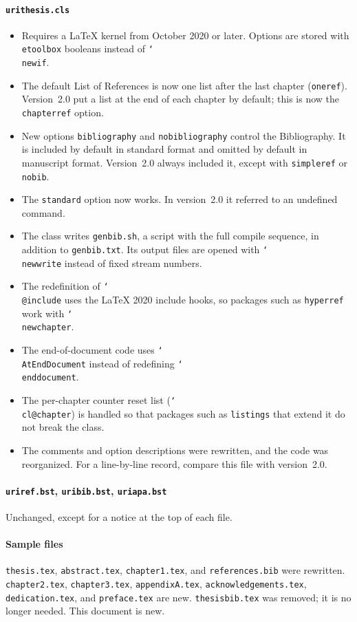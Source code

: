 \documentclass[11pt]{article}
\newcommand\cs[1]{\texttt{\char`\\#1}}
\newcommand\opt[1]{\texttt{#1}}
\newcommand\file[1]{\texttt{#1}}
\begin{document}
\paragraph{\file{urithesis.cls}}
\begin{itemize}
\item Requires a \LaTeX{} kernel from October 2020 or later.
  Options are stored with \texttt{etoolbox} booleans instead of \cs{newif}.
\item The default List of References is now one list after the last chapter
  (\opt{oneref}). Version~2.0 put a list at the end of each chapter by
  default; this is now the \opt{chapterref} option.
\item New options \opt{bibliography} and \opt{nobibliography} control the
  Bibliography. It is included by default in standard format and omitted by
  default in manuscript format. Version~2.0 always included it, except with
  \opt{simpleref} or \opt{nobib}.
\item The \opt{standard} option now works. In version~2.0 it referred to an
  undefined command.
\item The class writes \file{genbib.sh}, a script with the full compile
  sequence, in addition to \file{genbib.txt}. Its output files are opened with
  \cs{newwrite} instead of fixed stream numbers.
\item The redefinition of \cs{@include} uses the \LaTeX{} 2020 include hooks,
  so packages such as \texttt{hyperref} work with \cs{newchapter}.
\item The end-of-document code uses \cs{AtEndDocument} instead of redefining
  \cs{enddocument}.
\item The per-chapter counter reset list (\cs{cl@chapter}) is handled so that
  packages such as \texttt{listings} that extend it do not break the class.
\item The comments and option descriptions were rewritten, and the code was
  reorganized. For a line-by-line record, compare this file with version~2.0.
\end{itemize}

\paragraph{\file{uriref.bst}, \file{uribib.bst}, \file{uriapa.bst}}
Unchanged, except for a notice at the top of each file.

\paragraph{Sample files}
\file{thesis.tex}, \file{abstract.tex}, \file{chapter1.tex}, and
\file{references.bib} were rewritten.
\file{chapter2.tex}, \file{chapter3.tex}, \file{appendixA.tex},
\file{acknowledgements.tex}, \file{dedication.tex}, and \file{preface.tex} are
new.
\file{thesisbib.tex} was removed; it is no longer needed.
This document is new.
\end{document}
